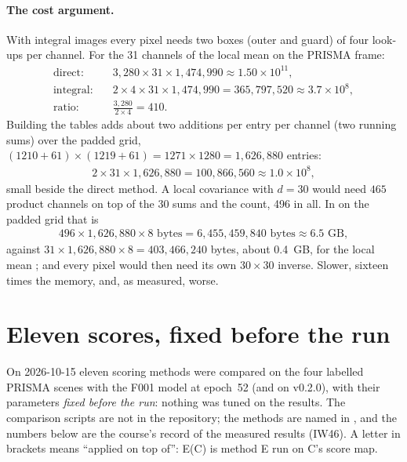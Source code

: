 \paragraph{The cost argument.} With integral images every pixel needs two boxes (outer and guard) of four
look-ups per channel. For the 31 channels of the local mean on the PRISMA frame:
\begin{align*}
\text{direct:} &\quad 3{,}280\times31\times1{,}474{,}990\approx1.50\times10^{11},\\
\text{integral:} &\quad 2\times4\times31\times1{,}474{,}990 = 365{,}797{,}520\approx3.7\times10^{8},\\
\text{ratio:} &\quad \frac{3{,}280}{2\times4} = 410.
\end{align*}
Building the tables adds about two additions per entry per channel (two running sums) over the padded grid,
$(1210+61)\times(1219+61)=1271\times1280=1{,}626{,}880$ entries:
\begin{align*}
2\times31\times1{,}626{,}880 = 100{,}866{,}560\approx1.0\times10^{8},
\end{align*}
small beside the direct method. A local covariance with $d=30$ would need $465$ product channels on top of the
30 sums and the count, 496 in all. In  on the padded grid that is
\begin{align*}
496\times1{,}626{,}880\times8 \text{ bytes} = 6{,}455{,}459{,}840 \text{ bytes}\approx6.5\text{ GB},
\end{align*}
against $31\times1{,}626{,}880\times8=403{,}466{,}240$ bytes, about 0.4~GB, for the local mean \tagC; and every
pixel would then need its own $30\times30$ inverse. Slower, sixteen times the memory, and, as measured,
worse.

\section{Eleven scores, fixed before the run}\label{sec:residualmaha:eleven}

On 2026-10-15 eleven scoring methods were compared on the four labelled PRISMA scenes with the F001 model at
epoch~52 (and on v0.2.0), with their parameters \emph{fixed before the run}: nothing was tuned on the
results. The comparison scripts are not in the repository; the methods are named in
, and the numbers below are the course's record of the measured
results (IW46). A letter in brackets means ``applied on top of'': E(C) is method E run on C's score map.

